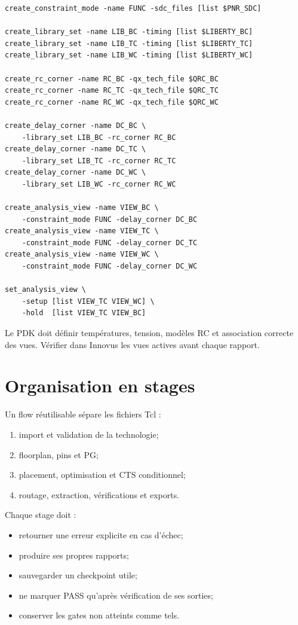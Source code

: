 \documentclass[11pt,a4paper,openany]{report}
\begin{document}
\begin{lstlisting}[style=guidecode,language=TclGuide]
create_constraint_mode -name FUNC -sdc_files [list $PNR_SDC]

create_library_set -name LIB_BC -timing [list $LIBERTY_BC]
create_library_set -name LIB_TC -timing [list $LIBERTY_TC]
create_library_set -name LIB_WC -timing [list $LIBERTY_WC]

create_rc_corner -name RC_BC -qx_tech_file $QRC_BC
create_rc_corner -name RC_TC -qx_tech_file $QRC_TC
create_rc_corner -name RC_WC -qx_tech_file $QRC_WC

create_delay_corner -name DC_BC \
    -library_set LIB_BC -rc_corner RC_BC
create_delay_corner -name DC_TC \
    -library_set LIB_TC -rc_corner RC_TC
create_delay_corner -name DC_WC \
    -library_set LIB_WC -rc_corner RC_WC

create_analysis_view -name VIEW_BC \
    -constraint_mode FUNC -delay_corner DC_BC
create_analysis_view -name VIEW_TC \
    -constraint_mode FUNC -delay_corner DC_TC
create_analysis_view -name VIEW_WC \
    -constraint_mode FUNC -delay_corner DC_WC

set_analysis_view \
    -setup [list VIEW_TC VIEW_WC] \
    -hold  [list VIEW_TC VIEW_BC]
\end{lstlisting}

Le PDK doit définir températures, tension, modèles RC et association correcte
des vues. Vérifier dans Innovus les vues actives avant chaque rapport.

\section{Organisation en stages}

Un flow réutilisable sépare les fichiers Tcl :

\begin{enumerate}
  \item import et validation de la technologie;
  \item floorplan, pins et PG;
  \item placement, optimisation et CTS conditionnel;
  \item routage, extraction, vérifications et exports.
\end{enumerate}

Chaque stage doit :

\begin{itemize}
  \item retourner une erreur explicite en cas d'échec;
  \item produire ses propres rapports;
  \item sauvegarder un checkpoint utile;
  \item ne marquer PASS qu'après vérification de ses sorties;
  \item conserver les gates non atteints comme tels.
\end{itemize}
\end{document}
